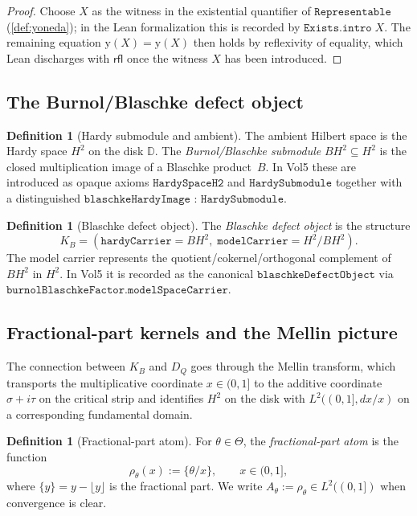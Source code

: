 \documentclass[12pt]{article}
\theoremstyle{plain}
\theoremstyle{definition}
\newtheorem{definition}[theorem]{Definition}
\theoremstyle{remark}
\newcommand{\KB}{K_{B}}
\newcommand{\HardyTwo}{H^{2}}
\newcommand{\Disk}{\mathbb{D}}
\newcommand{\fracpart}[1]{\{#1\}}
\newcommand{\Yon}{\mathrm{y}}
\newcommand{\DQ}{D_{Q}}
\begin{document}
\begin{proof}
Choose $X$ as the witness in the existential quantifier of
$\texttt{Representable}$ (\cref{def:yoneda}); in the Lean
formalization this is recorded by $\texttt{Exists.intro}\;X$.  The
remaining equation $\Yon(X) = \Yon(X)$ then holds by reflexivity of
equality, which Lean discharges with $\mathsf{rfl}$ once the witness
$X$ has been introduced.
\end{proof}

\subsection{The Burnol/Blaschke defect object}

\begin{definition}[Hardy submodule and ambient]
\label{def:hardy}
The ambient Hilbert space is the Hardy space $\HardyTwo$ on the disk
$\Disk$.  The \emph{Burnol/Blaschke submodule}
$B\HardyTwo\subseteq\HardyTwo$ is the closed multiplication image of a
Blaschke product~$B$.  In Vol5 these are introduced as opaque axioms
$\texttt{HardySpaceH2}$ and $\texttt{HardySubmodule}$ together with a
distinguished $\texttt{blaschkeHardyImage : HardySubmodule}$.
\end{definition}

\begin{definition}[Blaschke defect object]
\label{def:bdo}
The \emph{Blaschke defect object} is the structure
\[
  \KB = (\texttt{hardyCarrier} = B\HardyTwo,\;
         \texttt{modelCarrier} = \HardyTwo / B\HardyTwo).
\]
The model carrier represents the quotient/cokernel/orthogonal
complement of $B\HardyTwo$ in $\HardyTwo$.  In Vol5 it is recorded as
the canonical $\texttt{blaschkeDefectObject}$ via
$\texttt{burnolBlaschkeFactor.modelSpaceCarrier}$.
\end{definition}

\subsection{Fractional-part kernels and the Mellin picture}
\label{subsec:mellin}

The connection between $\KB$ and $\DQ$ goes through the Mellin
transform, which transports the multiplicative coordinate
$x\in (0,1]$ to the additive coordinate
$\sigma + i\tau$ on the critical strip and identifies $\HardyTwo$ on
the disk with $L^{2}((0,1],dx/x)$ on a corresponding fundamental
domain.

\begin{definition}[Fractional-part atom]
\label{def:fpatom}
For $\theta\in\Theta$, the \emph{fractional-part atom} is the function
\[
  \rho_\theta(x) := \fracpart{\theta/x},\qquad x\in (0,1],
\]
where $\fracpart{y} = y - \lfloor y\rfloor$ is the fractional part.  We
write $A_\theta := \rho_\theta\in L^{2}((0,1])$ when convergence is
clear.
\end{definition}
\end{document}

